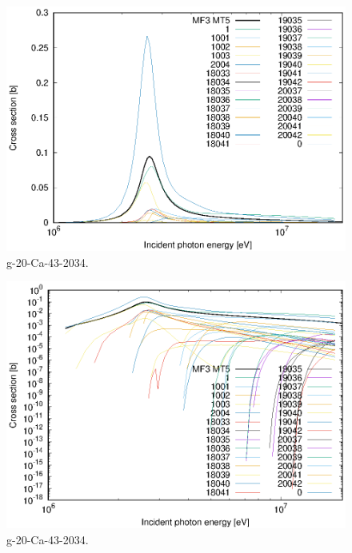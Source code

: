 \begin{figure}
 \includegraphics[width=\linewidth]{eps/g_20-Ca-43_2034.eps}
  \caption{g-20-Ca-43-2034.}
\end{figure}
\begin{figure}
 \includegraphics[width=\linewidth]{eps-log/g_20-Ca-43_2034.eps}
 \caption{g-20-Ca-43-2034.}
\end{figure}
\newpage \clearpage

